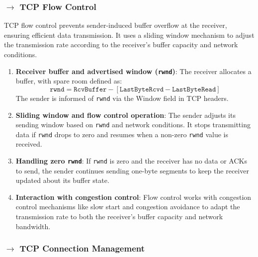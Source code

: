 \subsubsection[3.5.5 TCP Flow Control]{$\rightarrow$ TCP Flow Control}

TCP flow control prevents sender-induced buffer overflow at the receiver, ensuring efficient data transmission. It uses a sliding window mechanism to adjust the transmission rate according to the receiver's buffer capacity and network conditions.

\vspace{-0.5em}
\begin{enumerate}
    \item \textbf{Receiver buffer and advertised window (\texttt{rwnd})}: The receiver allocates a buffer, with spare room defined as:
          \begin{equation*}
            \texttt{rwnd} = \texttt{RcvBuffer} - [\texttt{LastByteRcvd} - \texttt{LastByteRead}]
          \end{equation*}
          The sender is informed of \texttt{rwnd} via the Window field in TCP headers.
          
    \item \textbf{Sliding window and flow control operation}: The sender adjusts its sending window based on \texttt{rwnd} and network conditions. It stops transmitting data if \texttt{rwnd} drops to zero and resumes when a non-zero \texttt{rwnd} value is received.
    
    \item \textbf{Handling zero \texttt{rwnd}}: If \texttt{rwnd} is zero and the receiver has no data or ACKs to send, the sender continues sending one-byte segments to keep the receiver updated about its buffer state.
    
    \item \textbf{Interaction with congestion control}: Flow control works with congestion control mechanisms like slow start and congestion avoidance to adapt the transmission rate to both the receiver's buffer capacity and network bandwidth.
\end{enumerate}

\subsubsection[3.5.6 TCP Connection Management]{$\rightarrow$ TCP Connection Management}

